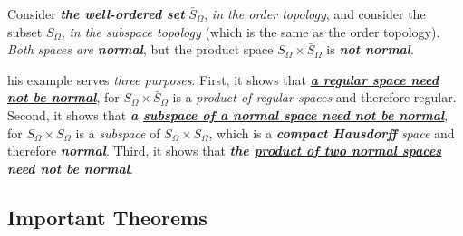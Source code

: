 \documentclass[11pt]{article}
\begin{document}
\begin{itemize}
\begin{example}
Consider \emph{\textbf{the well-ordered set}} $\bar{S}_{\Omega}$, \emph{in the order topology}, and consider the subset $S_{\Omega}$, \emph{in the subspace topology} (which is the same as the order topology). \emph{Both spaces are \textbf{normal}}, but the product space $S_{\Omega}\times \bar{S}_{\Omega}$ is \emph{\textbf{not normal}}.

his example serves \emph{three purposes}. First, it shows that \underline{\emph{\textbf{a regular space need not be normal}}}, for $S_{\Omega}\times \bar{S}_{\Omega}$ is a \emph{product of regular spaces} and therefore regular. Second, it shows that \emph{\textbf{a \underline{subspace of a normal space need not be normal}}}, for $S_{\Omega}\times \bar{S}_{\Omega}$ is a \emph{subspace} of $\bar{S}_{\Omega}\times \bar{S}_{\Omega}$, which is a \emph{\textbf{compact Hausdorff} space} and therefore \emph{\textbf{normal}}. Third, it shows that \emph{\textbf{the \underline{product of two normal spaces need not be normal}}}.
\end{example}
\end{itemize}

\subsection{Important Theorems}
\end{document}
